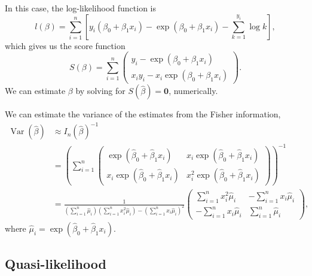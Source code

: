 \documentclass[letterpaper,11pt]{article}
\begin{document}
\begin{enumerate}
\begin{description}
    In this case, the log-likelihood function is
    \begin{equation}
      l\left(\beta\right) =
      \sum_{i=1}^n\left[
        y_i\left(\beta_0 + \beta_1x_i\right) -
        \exp\left(\beta_0 + \beta_1x_i\right) -
        \sum_{k=1}^{y_i}\log k
      \right],
    \end{equation}
    which gives us the score function
    \begin{equation}
      S\left(\beta\right) = \sum_{i=1}^n\begin{pmatrix}
        y_i - \exp\left(\beta_0 + \beta_1x_i\right) \\
        x_iy_i - x_i\exp\left(\beta_0 + \beta_1x_i\right)
      \end{pmatrix}.
      \label{eqn:p1_score_function}
    \end{equation}
    We can estimate $\beta$ by solving for
    $S\left(\hat{\beta}\right) = \mathbf{0}$, numerically.

    We can estimate the variance of the estimates from the Fisher information,
    \begin{align}
      \operatorname{Var}\left(
      \hat{\beta}
      \right)
      &\approx
        I_n\left(\hat{\beta}\right)^{-1} \label{eqn:p1_beta_hat_variance}\\
      &= \left(
        \sum_{i=1}^n\begin{pmatrix}
          \exp\left(\hat{\beta}_0 + \hat{\beta}_1x_i\right) &
          x_i\exp\left(\hat{\beta}_0 + \hat{\beta}_1x_i\right) \\
          x_i\exp\left(\hat{\beta}_0 + \hat{\beta}_1x_i\right) &
          x_i^2\exp\left(\hat{\beta}_0 + \hat{\beta}_1x_i\right)
        \end{pmatrix} \right)^{-1}  \nonumber\\
      &= \frac{1}{
        \left(\sum_{i=1}^n \hat{\mu}_i\right)\left(\sum_{i=1}^n x_i^2\hat{\mu}_i\right)
        - \left(\sum_{i=1}^n x_i\hat{\mu}_i\right)^2}
        \begin{pmatrix}
          \sum_{i=1}^n x_i^2\hat{\mu}_i &
          -\sum_{i=1}^n x_i\hat{\mu}_i \\
          -\sum_{i=1}^n x_i\hat{\mu}_i &
          \sum_{i=1}^n \hat{\mu}_i
        \end{pmatrix}, \nonumber
    \end{align}
    where $\hat{\mu}_i = \exp\left(\hat{\beta}_0 + \hat{\beta}_1x_i\right)$.
    
    \subsection*{Quasi-likelihood}


\end{description}
\end{enumerate}
\end{document}
